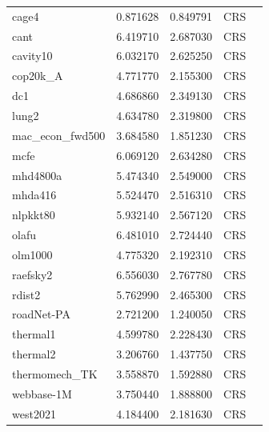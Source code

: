 \documentclass[12pt,oneside]{book} %
\begin{document}
\begin{longtable}{lcccr}
    cage4             & 0.871628     & 0.849791         & CRS                     \\
    cant              & 6.419710     & 2.687030         & CRS                     \\
    cavity10          & 6.032170     & 2.625250         & CRS                     \\
    cop20k\_A         & 4.771770     & 2.155300         & CRS                     \\
    dc1               & 4.686860     & 2.349130         & CRS                     \\
    lung2             & 4.634780     & 2.319800         & CRS                     \\
    mac\_econ\_fwd500 & 3.684580     & 1.851230         & CRS                     \\
    mcfe              & 6.069120     & 2.634280         & CRS                     \\
    mhd4800a          & 5.474340     & 2.549000         & CRS                     \\
    mhda416           & 5.524470     & 2.516310         & CRS                     \\
    nlpkkt80          & 5.932140     & 2.567120         & CRS                     \\
    olafu             & 6.481010     & 2.724440         & CRS                     \\
    olm1000           & 4.775320     & 2.192310         & CRS                     \\
    raefsky2          & 6.556030     & 2.767780         & CRS                     \\
    rdist2            & 5.762990     & 2.465300         & CRS                     \\
    roadNet-PA        & 2.721200     & 1.240050         & CRS                     \\
    thermal1          & 4.599780     & 2.228430         & CRS                     \\
    thermal2          & 3.206760     & 1.437750         & CRS                     \\
    thermomech\_TK    & 3.558870     & 1.592880         & CRS                     \\
    webbase-1M        & 3.750440     & 1.888800         & CRS                     \\
    west2021          & 4.184400     & 2.181630         & CRS                     \\
\end{longtable}
\end{document}
